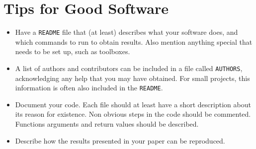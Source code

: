 \documentclass[10pt,conference,compsocconf]{IEEEtran}
\begin{document}

\section{Tips for Good Software}
\label{sec:tips-software}

\begin{itemize}
\item Have a \texttt{README} file that (at least) describes what your
  software does, and which commands to run to obtain results. Also
  mention anything special that needs to be set up, such as
  toolboxes.
\item A list of authors and contributors can be included in a file
  called \texttt{AUTHORS}, acknowledging any help that you may have
  obtained. For small projects, this information is often also
  included in the \texttt{README}.
\item Document your code. Each file should at least have a short
  description about its reason for existence. Non obvious steps in the
  code should be commented. Functions arguments and return values should be described.
\item Describe how the results presented in your paper can be reproduced.
\end{itemize}



\end{document}
